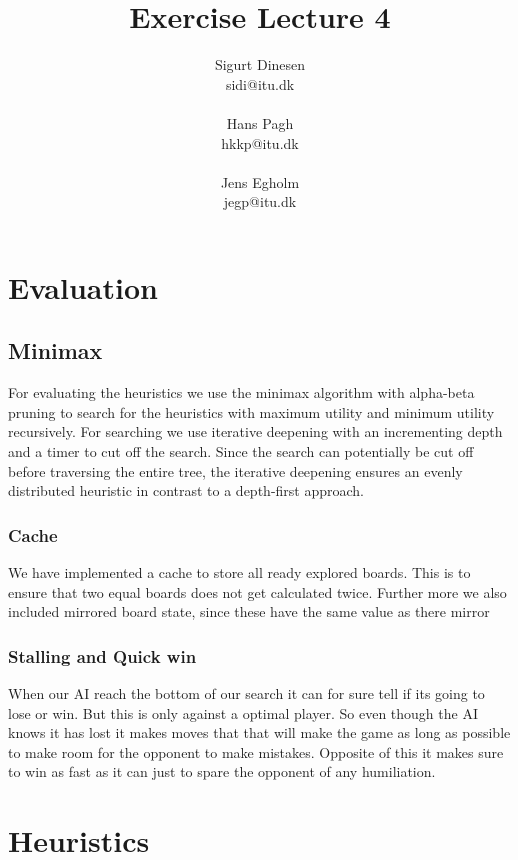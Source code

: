 \documentclass[a4paper, titlepage]{article}
\begin{document}
\title{Exercise Lecture 4}
\author{Sigurt Dinesen \\sidi@itu.dk \\\\ Hans Pagh \\hkkp@itu.dk 
\\\\Jens Egholm \\jegp@itu.dk}
\maketitle
\pagebreak

\section*{Evaluation}
\subsection*{Minimax}
For evaluating the heuristics we use the minimax algorithm with alpha-beta pruning to
search for the heuristics with maximum utility and minimum utility recursively. 
For searching we use iterative deepening with an incrementing depth and a timer to cut off
the search. Since the search can potentially be cut off before traversing the entire tree, 
the iterative deepening ensures an evenly distributed heuristic in contrast to a depth-first
approach.
\subsubsection{Cache}
We have implemented a cache to store all ready explored boards. This is to ensure that two equal boards does not get calculated twice.
Further more we also included mirrored board state, since these have the same value as there mirror

\subsubsection{Stalling and Quick win}
When our AI reach the bottom of our search it can for sure tell if its going to lose or win. But this is only against a optimal player.
So even though the AI knows it has lost it makes moves that that will make the game as long as possible to make room for the opponent to make mistakes.
Opposite of this it makes sure to win as fast as it can just to spare the opponent of any humiliation.

\section*{Heuristics}
\end{document}
